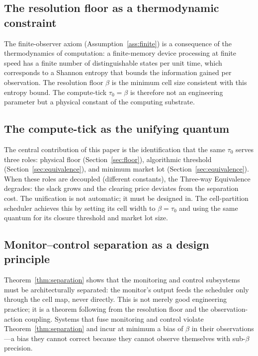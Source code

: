 \documentclass[11pt,twocolumn,a4paper]{article}
\theoremstyle{plain}
\theoremstyle{definition}
\theoremstyle{remark}
\newcommand{\tick}{\tau_0}
\newcommand{\floor}{\beta}
\begin{document}
\subsection{The resolution floor as a thermodynamic constraint}

The finite-observer axiom (Assumption~\ref{ass:finite}) is a consequence of the thermodynamics of computation: a finite-memory device processing at finite speed has a finite number of distinguishable states per unit time, which corresponds to a Shannon entropy \cite{shannon1948} that bounds the information gained per observation. The resolution floor $\floor$ is the minimum cell size consistent with this entropy bound. The compute-tick $\tick = \floor$ is therefore not an engineering parameter but a physical constant of the computing substrate.

\subsection{The compute-tick as the unifying quantum}

The central contribution of this paper is the identification that the same $\tick$ serves three roles: physical floor (Section~\ref{sec:floor}), algorithmic threshold (Section~\ref{sec:equivalence}), and minimum market lot (Section~\ref{sec:equivalence}). When these roles are decoupled (different constants), the Three-way Equivalence degrades: the slack grows and the clearing price deviates from the separation cost. The unification is not automatic; it must be designed in. The cell-partition scheduler achieves this by setting its cell width to $\floor = \tick$ and using the same quantum for its closure threshold and market lot size.

\subsection{Monitor--control separation as a design principle}

Theorem~\ref{thm:separation} shows that the monitoring and control subsystems must be architecturally separated: the monitor's output feeds the scheduler only through the cell map, never directly. This is not merely good engineering practice; it is a theorem following from the resolution floor and the observation-action coupling. Systems that fuse monitoring and control violate Theorem~\ref{thm:separation} and incur at minimum a bias of $\floor$ in their observations---a bias they cannot correct because they cannot observe themselves with sub-$\floor$ precision.
\end{document}
